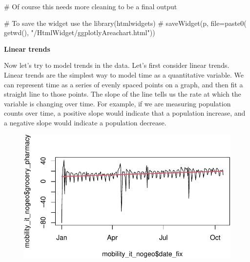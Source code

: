 \documentclass[
  letterpaper,
  DIV=11,
  numbers=noendperiod]{scrreprt}
\newenvironment{Shaded}{\begin{snugshade}}{\end{snugshade}}
\newcommand{\AttributeTok}[1]{\textcolor[rgb]{0.40,0.45,0.13}{#1}}
\newcommand{\CommentTok}[1]{\textcolor[rgb]{0.37,0.37,0.37}{#1}}
\newcommand{\DecValTok}[1]{\textcolor[rgb]{0.68,0.00,0.00}{#1}}
\newcommand{\FunctionTok}[1]{\textcolor[rgb]{0.28,0.35,0.67}{#1}}
\newcommand{\NormalTok}[1]{\textcolor[rgb]{0.00,0.23,0.31}{#1}}
\newcommand{\OtherTok}[1]{\textcolor[rgb]{0.00,0.23,0.31}{#1}}
\newcommand{\SpecialCharTok}[1]{\textcolor[rgb]{0.37,0.37,0.37}{#1}}
\newcommand{\StringTok}[1]{\textcolor[rgb]{0.13,0.47,0.30}{#1}}
\begin{document}
\begin{Shaded}
\begin{Highlighting}[]
\CommentTok{\# Of course this needs more cleaning to be a final output}

\CommentTok{\# To save the widget use the library(htmlwidgets)}
\CommentTok{\# saveWidget(p, file=paste0( getwd(), "/HtmlWidget/ggplotlyAreachart.html"))}
\end{Highlighting}
\end{Shaded}

\textbf{Linear trends}

Now let's try to model trends in the data. Let's first consider linear
trends. Linear trends are the simplest way to model time as a
quantitative variable. We can represent time as a series of evenly
spaced points on a graph, and then fit a straight line to those points.
The slope of the line tells us the rate at which the variable is
changing over time. For example, if we are measuring population counts
over time, a positive slope would indicate that a population increase,
and a negative slope would indicate a population decrease.

\begin{Shaded}
\end{Shaded}

\begin{figure}[H]

{\centering \includegraphics{longitudinal-1_files/figure-pdf/unnamed-chunk-12-1.pdf}

}

\end{figure}
\end{document}
